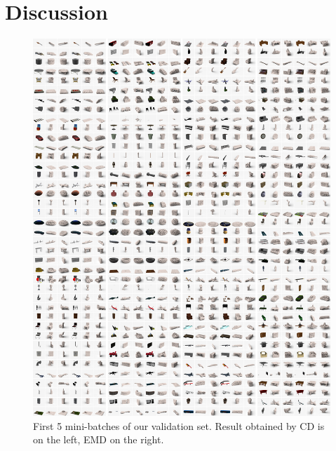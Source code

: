 \documentclass[10pt,twocolumn,letterpaper]{article}
\begin{document}
\section{Discussion}


\begin{figure}
	\centering
	\includegraphics[width=\linewidth]{./fig/show_all_emd.jpg}
	\caption{First 5 mini-batches of our validation set. Result obtained by CD is on the left, EMD on the right.}
	\label{fig:show_all}
\end{figure}

%

{

}
\end{document}
